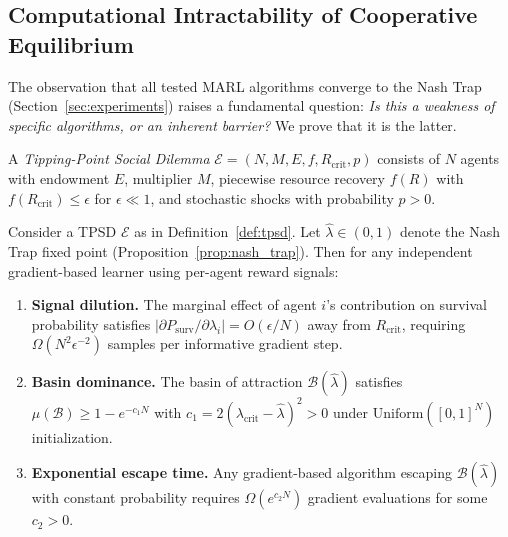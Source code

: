 
\subsection{Computational Intractability of Cooperative Equilibrium}
\label{sec:impossibility}

The observation that all tested MARL algorithms converge to the Nash Trap
(Section~\ref{sec:experiments}) raises a fundamental question:
\emph{Is this a weakness of specific algorithms, or an inherent barrier?}
We prove that it is the latter.

\begin{definition}
\label{def:tpsd}
A \emph{Tipping-Point Social Dilemma} $\mathcal{E} = (N, M, E, f, R_{\mathrm{crit}}, p)$
consists of $N$ agents with endowment $E$, multiplier $M$,
piecewise resource recovery $f(R)$ with $f(R_{\mathrm{crit}}) \leq \epsilon$
for $\epsilon \ll 1$, and stochastic shocks with probability $p>0$.
\end{definition}

\begin{proposition}
\label{thm:impossibility}
Consider a TPSD $\mathcal{E}$ as in Definition~\ref{def:tpsd}.
Let $\hat{\lambda} \in (0,1)$ denote the Nash Trap fixed point
(Proposition~\ref{prop:nash_trap}).
Then for any independent gradient-based learner using per-agent reward signals:
\begin{enumerate}
  \item[\textbf{(i)}] \textbf{Signal dilution.}
    The marginal effect of agent $i$'s contribution on survival probability satisfies
    $|\partial P_{\mathrm{surv}} / \partial \lambda_i| = O(\epsilon / N)$
    away from $R_{\mathrm{crit}}$, requiring
    $\Omega(N^2 \epsilon^{-2})$ samples per informative gradient step.
  \item[\textbf{(ii)}] \textbf{Basin dominance.}
    The basin of attraction $\mathcal{B}(\hat{\lambda})$ satisfies
    $\mu(\mathcal{B}) \geq 1 - e^{-c_1 N}$ with $c_1 = 2(\lambda_{\mathrm{crit}} - \hat{\lambda})^2 > 0$
    under $\mathrm{Uniform}([0,1]^N)$ initialization.
  \item[\textbf{(iii)}] \textbf{Exponential escape time.}
    Any gradient-based algorithm escaping $\mathcal{B}(\hat{\lambda})$
    with constant probability requires
    $\Omega(e^{c_2 N})$ gradient evaluations
    for some $c_2 > 0$.
\end{enumerate}
\end{proposition}


